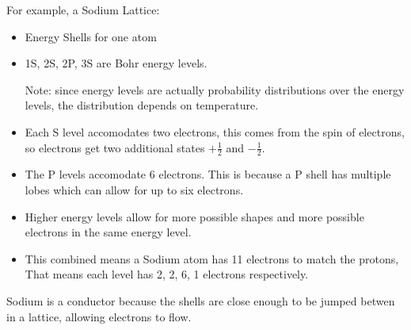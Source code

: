 \documentclass{report}
\begin{document}
\begin{description}
\begin{mdframed}
            For example, a Sodium Lattice:
            \begin{itemize}
                \item Energy Shells for one atom
                \item 1S, 2S, 2P, 3S are Bohr energy
                    levels.
                    \begin{mdframed}
                        Note: since energy levels are actually
                        probability distributions over
                        the energy levels, the distribution
                        depends on temperature.
                    \end{mdframed}
                \item Each S level accomodates two electrons,
                    this comes from the spin of electrons,
                    so electrons get two additional states
                    $+\frac{1}{2}$ and  $-\frac{1}{2}$.
                \item The P levels accomodate 6 electrons.
                    This is because a P shell has multiple
                    lobes which can allow for up to six
                    electrons.
                \item Higher energy levels allow for more possible
                    shapes and more possible electrons in the same
                    energy level.
                \item This combined means a Sodium atom has
                    11 electrons to match the protons,
                    That means each level has 2, 2, 6,
                    1 electrons respectively.
            \end{itemize}

            Sodium is a conductor because the shells are close enough
            to be jumped betwen in a lattice, allowing electrons to flow.
        \end{mdframed}
\end{description}
\end{document}
